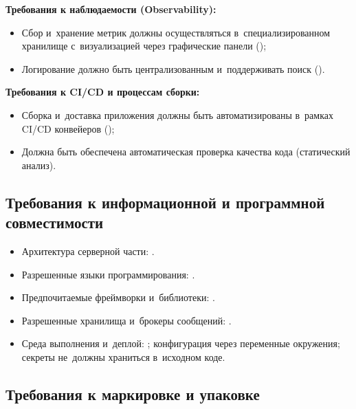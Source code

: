 \documentclass[12pt,a4paper]{extarticle}
\begin{document}
\textbf{Требования к наблюдаемости (Observability):}

\begin{itemize}[leftmargin=1.25cm]
\item Сбор и~хранение метрик должны осуществляться в~специализированном хранилище с~визуализацией через графические панели ();
\item Логирование должно быть централизованным и~поддерживать поиск ().
\end{itemize}

\textbf{Требования к CI/CD и процессам сборки:}

\begin{itemize}[leftmargin=1.25cm]
\item Сборка и~доставка приложения должны быть автоматизированы в~рамках CI/CD конвейеров ();
\item Должна быть обеспечена автоматическая проверка качества кода (статический анализ).
\end{itemize}

\subsection{Требования к информационной и программной совместимости}

\begin{itemize}[leftmargin=1.25cm]
\item Архитектура серверной части: .
\item Разрешенные языки программирования: .
\item Предпочитаемые фреймворки и~библиотеки: .
\item Разрешенные хранилища и~брокеры сообщений: .
\item Среда выполнения и~деплой: ; конфигурация через переменные окружения; секреты не~должны храниться в~исходном коде.
\end{itemize}

\subsection{Требования к маркировке и упаковке}
\end{document}
